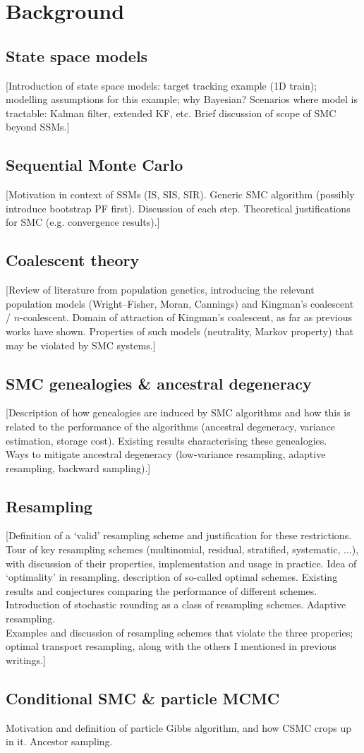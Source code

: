 \chapter{Background}

\section{State space models}
[Introduction of state space models: target tracking example (1D train); modelling assumptions for this example; why Bayesian?
Scenarios where model is tractable: Kalman filter, extended KF, etc.
Brief discussion of scope of SMC beyond SSMs.]

\section{Sequential Monte Carlo}
[Motivation in context of SSMs (IS, SIS, SIR). Generic SMC algorithm (possibly introduce bootstrap PF first). Discussion of each step.
Theoretical justifications for SMC (e.g. convergence results).]

\section{Coalescent theory}
[Review of literature from population genetics, introducing the relevant population models (Wright--Fisher, Moran, Cannings) and Kingman's coalescent / $n$-coalescent. Domain of attraction of Kingman's coalescent, as far as previous works have shown. Properties of such models (neutrality, Markov property) that may be violated by SMC systems.]

\section{SMC genealogies \& ancestral degeneracy}
[Description of how genealogies are induced by SMC algorithms and how this is related to the performance of the algorithms (ancestral degeneracy, variance estimation, storage cost). Existing results characterising these genealogies.\\
Ways to mitigate ancestral degeneracy (low-variance resampling, adaptive resampling, backward sampling).]

\section{Resampling} 
[Definition of a `valid' resampling scheme and justification for these restrictions. Tour of key resampling schemes (multinomial, residual, stratified, systematic, ...), with discussion of their properties, implementation and usage in practice. Idea of `optimality' in resampling, description of so-called optimal schemes. Existing results and conjectures comparing the performance of different schemes. Introduction of stochastic rounding as a class of resampling schemes. Adaptive resampling.\\
Examples and discussion of resampling schemes that violate the three properies; optimal transport resampling, along with the others I mentioned in previous writings.]

\section{Conditional SMC \& particle MCMC}
Motivation and definition of particle Gibbs algorithm, and how CSMC crops up in it. Ancestor sampling.